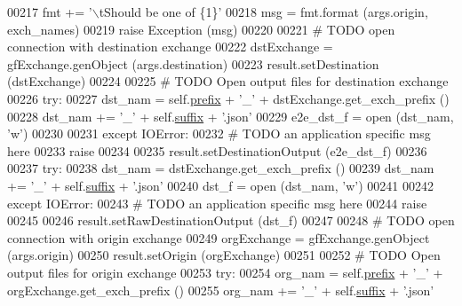 \begin{DoxyCode}
{00217             fmt += \textcolor{stringliteral}{'\(\backslash\)tShould be one of \{1\}'}
00218             msg = fmt.format (args.origin, exch\_names)
00219             \textcolor{keywordflow}{raise} Exception (msg)
00220         
00221         \textcolor{comment}{# TODO open connection with destination exchange}
00222         dstExchange = gfExchange.genObject (args.destination)
00223         result.setDestination (dstExchange)
00224             
00225         \textcolor{comment}{# TODO Open output files for destination exchange}
00226         \textcolor{keywordflow}{try}:
00227             dst\_nam  =  self.\hyperlink{classe2e_1_1_application_a027ff25e5409ae17584978a09fc2611a}{prefix} + \textcolor{stringliteral}{'\_'} + dstExchange.get\_exch\_prefix ()
00228             dst\_nam += \textcolor{stringliteral}{'\_'} + self.\hyperlink{classe2e_1_1_application_a4d824ad36b051d2d629edb314385df0d}{suffix} + \textcolor{stringliteral}{'.json'}
00229             e2e\_dst\_f = open (dst\_nam, \textcolor{stringliteral}{'w'})
00230             
00231         \textcolor{keywordflow}{except} IOError:
00232             \textcolor{comment}{# TODO an application specific msg here}
00233             \textcolor{keywordflow}{raise}
00234             
00235         result.setDestinationOutput (e2e\_dst\_f)
00236             
00237         \textcolor{keywordflow}{try}:
00238             dst\_nam  = dstExchange.get\_exch\_prefix ()
00239             dst\_nam += \textcolor{stringliteral}{'\_'} + self.\hyperlink{classe2e_1_1_application_a4d824ad36b051d2d629edb314385df0d}{suffix} + \textcolor{stringliteral}{'.json'}
00240             dst\_f = open (dst\_nam, \textcolor{stringliteral}{'w'})
00241             
00242         \textcolor{keywordflow}{except} IOError:
00243             \textcolor{comment}{# TODO an application specific msg here}
00244             \textcolor{keywordflow}{raise}
00245             
00246         result.setRawDestinationOutput (dst\_f)
00247             
00248         \textcolor{comment}{# TODO open connection with origin exchange}
00249         orgExchange = gfExchange.genObject (args.origin)
00250         result.setOrigin (orgExchange)
00251             
00252         \textcolor{comment}{# TODO Open output files for origin exchange}
00253         \textcolor{keywordflow}{try}:
00254             org\_nam  =  self.\hyperlink{classe2e_1_1_application_a027ff25e5409ae17584978a09fc2611a}{prefix} + \textcolor{stringliteral}{'\_'} + orgExchange.get\_exch\_prefix ()
00255             org\_nam += \textcolor{stringliteral}{'\_'} + self.\hyperlink{classe2e_1_1_application_a4d824ad36b051d2d629edb314385df0d}{suffix} + \textcolor{stringliteral}{'.json'}
}
\end{DoxyCode}
